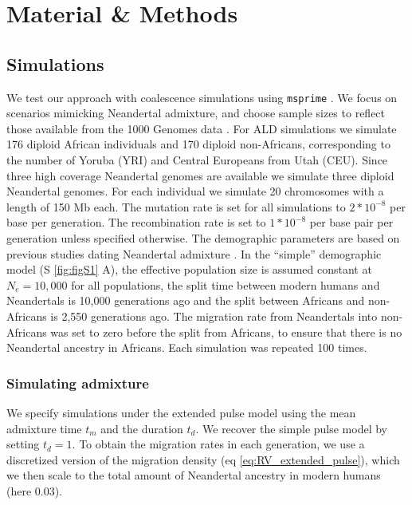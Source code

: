 \documentclass[]{article}
\begin{document}
\section{Material \& Methods}\label{methods}


\subsection{Simulations}\label{simulations}

We test our approach with coalescence simulations using  \texttt{msprime} 
\citep{kelleher_efficient_2016}. We focus on scenarios mimicking Neandertal admixture, and choose sample sizes to reflect those available from the 1000 Genomes data \citep{the_1000_genomes_project_consortium_global_2015}. For ALD simulations we simulate 176 diploid
African individuals and 170 diploid non-Africans, corresponding to the
number of Yoruba (YRI) and Central Europeans from Utah (CEU). 
Since three high coverage Neandertal genomes are available \citep{prufer_complete_2013,prufer_high-coverage_2017,mafessoni_high_coverage_2020} we  simulate three diploid Neandertal genomes. For each individual we simulate 20
chromosomes with a length of 150 Mb each. The mutation rate is set for
all simulations to \(2*10^{-8}\) per base per generation. The
recombination rate is set to \(1*10^{-8}\) per base pair per generation
unless specified otherwise. The demographic parameters are based on
previous studies dating Neandertal admixture
\citep{sankararaman_date_2012,fu_genome_2014,moorjani_genetic_2016}. In
the ``simple'' demographic model (S \ref{fig:figS1} A), the effective
population size is assumed constant at $N_e=10,000$ for all populations, the
split time between modern humans and Neandertals is 10,000 generations
ago and the split between Africans and non-Africans is 2,550
generations ago. The migration rate from Neandertals into non-Africans
was set to zero before the split from Africans, to ensure that there is no Neandertal
ancestry in Africans. Each simulation was repeated 100 times. 


\subsubsection{Simulating admixture}\label{Simulating the expanded pulse}
We specify simulations under the extended pulse model using the mean admixture time $t_m$ and the duration $t_d$. We recover the simple pulse model by setting $t_d=1$. To obtain the migration rates in each generation, we use a discretized version of the migration density (eq \ref{eq:RV_extended_pulse}), which we then scale to the total amount of Neandertal ancestry in modern humans (here 0.03). 
\end{document}
